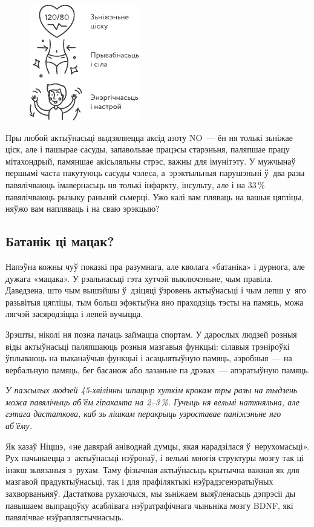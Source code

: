 \begin{figure}[htb!]
  \centering
  \includegraphics[scale=1.5]{willpower/ch5/2.pdf}
\end{figure}

Пры любой актыўнасьці выдзяляецца аксід азоту NO~--- ён ня толькі зьніжае ціск, але і пашырае сасуды, запавольвае працэсы старэньня, паляпшае працу мітахондрый, памяншае акісьляльны стрэс, важны для імунітэту. У мужчынаў першымі часта пакутуюць сасуды чэлеса, а~эрэктыльныя парушэньні ў~два разы павялічваюць імавернасьць ня толькі інфаркту, інсульту, але і на 33\,\% павялічваюць рызыку раньняй сьмерці. Ужо калі вам пляваць на вашыя цягліцы, няўжо вам напляваць і на сваю эрэкцыю?

\subsection*{Батанік ці мацак?}

Напэўна кожны чуў показкі пра разумнага, але кволага «батаніка» і дурнога, але дужага «мацака». У рэальнасьці гэта хутчэй выключэньне, чым правіла. Даведзена, што чым вышэйшы ў~дзіцяці ўзровень актыўнасьці і чым лепш у~яго разьвітыя цягліцы, тым больш эфэктыўна яно праходзіць тэсты на памяць, можа лягчэй засяродзіцца і лепей вучыцца.

Зрэшты, ніколі ня позна пачаць займацца спортам. У дарослых людзей розныя віды актыўнасьці паляпшаюць розныя мазгавыя функцыі: сілавыя трэніроўкі ўплываюць на выканаўчыя функцыі і асацыятыўную памяць, аэробныя~--- на вербальную памяць, бег басанож або лазаньне па дрэвах~--- апэратыўную памяць.

\emph{У пажылых людзей 45-хвілінны шпацыр хуткім крокам тры разы на тыдзень можа павялічыць аб'ём гіпакампа на 2--3\,\%. Гучыць ня вельмі натхняльна, але гэтага дастаткова, каб зь лішкам перакрыць узроставае паніжэньне яго аб'ёму.}

Як казаў Ніцшэ, «не давярай аніводнай думцы, якая нарадзілася ў~нерухомасьці». Рух пачынаецца з~актыўнасьці нэўронаў, і вельмі многія структуры мозгу так ці інакш зьвязаныя з~рухам. Таму фізычная актыўнасьць крытычна важная як для мазгавой прадуктыўнасьці, так і для прафіляктыкі нэўрадэгенэратыўных захворваньняў. Дастаткова рухаючыся, мы зьніжаем выяўленасьць дэпрэсіі ды павышаем выпрацоўку асаблівага нэўратрафічнага чыньніка мозгу BDNF, які павялічвае нэўраплястычнасьць.

